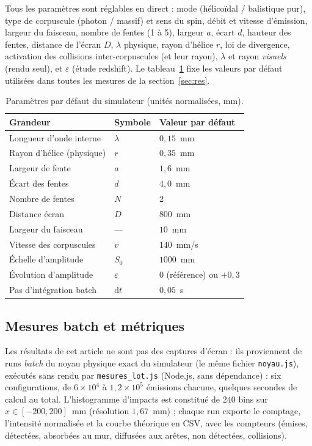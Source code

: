 \documentclass[11pt,a4paper]{article}
\begin{document}
Tous les paramètres sont réglables en direct : mode (hélicoïdal / balistique pur),
type de corpuscule (photon / massif) et sens du spin, débit et vitesse d'émission,
largeur du faisceau, nombre de fentes (1 à 5), largeur $a$, écart $d$, hauteur des
fentes, distance de l'écran $D$, $\lambda$ physique, rayon d'hélice $r$, loi de
divergence, activation des collisions inter-corpuscules (et leur rayon), $\lambda$
et rayon \emph{visuels} (rendu seul), et $\varepsilon$ (étude redshift). Le
tableau~\ref{tab:params} fixe les valeurs par défaut utilisées dans toutes les
mesures de la section~\ref{sec:res}.

\begin{table}[t]
\centering\small
\caption{Paramètres par défaut du simulateur (unités normalisées, mm).}
\label{tab:params}
\begin{tabular*}{0.86\textwidth}{@{\extracolsep{\fill}} l l l}
\toprule
Grandeur & Symbole & Valeur par défaut \\
\midrule
Longueur d'onde interne & $\lambda$ & $0{,}15$~mm \\
Rayon d'hélice (physique) & $r$ & $0{,}35$~mm \\
Largeur de fente & $a$ & $1{,}6$~mm \\
Écart des fentes & $d$ & $4{,}0$~mm \\
Nombre de fentes & $N$ & 2 \\
Distance écran & $D$ & $800$~mm \\
Largeur du faisceau & --- & $10$~mm \\
Vitesse des corpuscules & $v$ & $140$~mm/s \\
Échelle d'amplitude & $S_0$ & $1000$~mm \\
Évolution d'amplitude & $\varepsilon$ & $0$ (référence) ou $+0{,}3$ \\
Pas d'intégration batch & $\mathrm{d}t$ & $0{,}05$~s \\
\bottomrule
\end{tabular*}
\end{table}

\subsection{Mesures batch et métriques}

Les résultats de cet article ne sont pas des captures d'écran : ils proviennent de
runs \emph{batch} du noyau physique exact du simulateur (le même fichier
\texttt{noyau.js}), exécutés sans rendu par \texttt{mesures\_lot.js}
(Node.js, sans dépendance) : six configurations, de $6\times10^4$ à
$1{,}2\times10^5$ émissions chacune, quelques secondes de calcul au total.
L'histogramme d'impacts est constitué de $240$ bins sur $x \in [-200, 200]$~mm
(résolution $1{,}67$~mm) ; chaque run exporte le comptage, l'intensité normalisée
et la courbe théorique en CSV, avec les compteurs (émises, détectées, absorbées au
mur, diffusées aux arêtes, non détectées, collisions).
\end{document}
